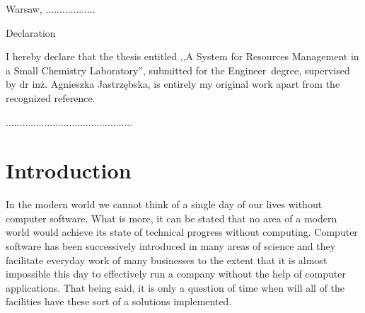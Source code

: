 \documentclass[a4paper,11pt,twoside]{report}
\theoremstyle{definition}
\renewcommand{\title}{A System for Resources Management in a Small Chemistry Laboratory}
\newcommand{\type}{Engineer} %
\newcommand{\supervisor}{dr inż. Agnieszka Jastrzębska} %
\begin{document}
\null\thispagestyle{empty}\newpage

\null \hfill Warsaw, ..................

\par\vspace{5cm}

\begin{center}
Declaration
\end{center}

I hereby declare that the thesis entitled ,,\title '', submitted for the \type ~degree, supervised  by \supervisor , is entirely my original work apart from the recognized reference.
\vspace{2cm}

\begin{flushright}
  \begin{minipage}{50mm}
    \begin{center}
      ..............................................

    \end{center}
  \end{minipage}
\end{flushright}

\thispagestyle{empty}
\newpage

\null\thispagestyle{empty}\newpage
\tableofcontents
\thispagestyle{empty}
\newpage %



\null\thispagestyle{empty}\newpage
\pagestyle{fancy}
\setcounter{page}{11}


\chapter*{Introduction}

In the modern world we cannot think of a single day of our lives without computer software. What is more, it can be stated that no area of a modern world would achieve its state of technical progress without computing. Computer software has been successively introduced in many areas of science and they facilitate everyday work of many businesses to the extent that it is almost impossible this day to effectively run a company without the help of computer applications.
That being said, it is only a question of time when will all of the facilities have these sort of a solutions implemented. 
\end{document}

